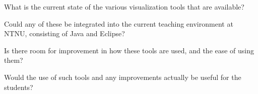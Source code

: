 \begin{theorem}
What is the current state of the various visualization tools that are available?
\end{theorem}
\begin{theorem}
Could any of these be integrated into the current teaching environment at NTNU, consisting of Java and Eclipse?
\end{theorem}
\begin{theorem}
Is there room for improvement in how these tools are used, and the ease of using them?
\end{theorem}
\begin{theorem}
Would the use of such tools and any improvements actually be useful for the students?
\end{theorem}
